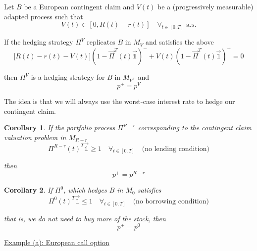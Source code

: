 \documentclass[12pt]{article}
\newenvironment{theorem}[2][Theorem:]{\begin{trivlist} %
\item[\hskip \labelsep {\bfseries #1}\hskip \labelsep {\bfseries #2.}]}{\end{trivlist}}
\newtheorem{corollary}{Corollary}
\begin{document}
\begin{theorem}{} Let $B$ be a European contingent claim and $V(t)$ be a (progressively measurable) adapted process such that 
\begin{equation*}
	V(t) \in [0, R(t) - r(t)] \quad \forall_{t \in [0, T]} \text{ a.s.}
\end{equation*}

If the hedging strategy $\Pi^V$ replicates $B$ in $M_V$ and satisfies the above
\begin{equation*}
	\big[R(t) - r(t) - V(t)\big]\left( 1 - \vec{\Pi}^T(t) \mathds {\vec{1}} \right)^- + V(t)\left( 1 - \vec{\Pi}^T(t) \mathds {\vec{1}} \right)^+ = 0
\end{equation*}

then $\Pi^V$ is a hedging strategy for $B$ in $M_{V^+}$ and 
\begin{equation*}
	p^+ = p^V
\end{equation*}
\end{theorem}

The idea is that we will always use the worst-case interest rate to hedge our contingent claim.


\begin{corollary} If the portfolio process $\Pi^{R - r}$ corresponding to the contingent claim valuation problem in $M_{R - r}$ 
\begin{equation*}
	\Pi^{R - r}(t)^T \mathds {\vec{1}} \geq 1 \quad \forall_{t\in[0,T]} \quad \text{(no lending condition)}
\end{equation*}

then
\begin{equation*}
	p^+ = p^{R - r}
\end{equation*}
\end{corollary}

\begin{corollary} If $\Pi^0$, which hedges $B$ in $M_0$ satisfies
\begin{equation*}
	\Pi^0(t)^T \mathds {\vec{1}} \leq 1 \quad \forall_{t\in[0,T]} \quad \text{(no borrowing condition)}
\end{equation*}

that is, we do not need to buy more of the stock, then
\begin{equation*}
	p^+ = p^0
\end{equation*}
\end{corollary}

\underline{Example (a): European call option} \\
\end{document}
